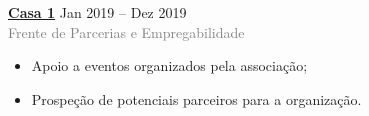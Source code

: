\documentclass[9pt]{developercv} %
\begin{document}
\hfill
\begin{minipage}[t]{0.3\textwidth}
	\vspace{-\baselineskip} %


	\textbf{\textcolor{bleu_cite}{\href{https://www.casaum.org/}{Casa 1}} } \hspace{1.cm} Jan 2019 --  Dez 2019\\
	\textcolor{gray}{Frente de Parcerias e Empregabilidade}
	\begin{itemize}
		\item Apoio a eventos organizados pela associação;
		\item Prospeção de potenciais parceiros para a organização.
	\end{itemize}
\end{minipage}


\end{document}
